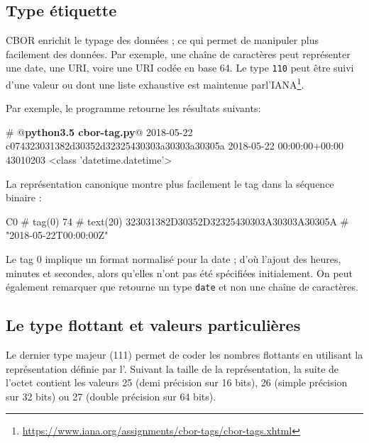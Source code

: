 \subsection{Type étiquette}

CBOR enrichit le typage des données ; ce qui permet de manipuler plus facilement des données. Par exemple, une chaîne de caractères peut représenter une date, une URI, voire une URI codée en base 64. Le type \texttt{110} peut être suivi d'une valeur ou  dont une liste exhaustive est maintenue parl'IANA\footnote{\url{https://www.iana.org/assignments/cbor-tags/cbor-tags.xhtml}}.


Par exemple, le programme  retourne les résultats suivants:

\begin{termc}[backgroundcolor=\color{palerod}, language=json, basicstyle=\ttfamily\small, escapechar=@]
# @\textbf{python3.5 cbor-tag.py}@
2018-05-22
c074323031382d30352d32325430303a30303a30305a
2018-05-22 00:00:00+00:00
43010203
<class 'datetime.datetime'>
\end{termc}


La représentation canonique montre plus facilement le tag dans la séquence binaire :
\begin{termc}[backgroundcolor=\color{palerod}, language=json, basicstyle=\ttfamily\small, escapechar=@]
C0                                      # tag(0)
   74                                   # text(20)
      323031382D30352D32325430303A30303A30305A # "2018-05-22T00:00:00Z"
\end{termc}

Le tag 0 implique un format normalisé pour la date ; d'où l'ajout des heures, minutes et secondes, alors qu'elles n'ont pas été spécifiées initialement. On peut également remarquer que  retourne un type \texttt{date} et non une chaîne de caractères.

\subsection{Le type flottant et valeurs particulières}
Le dernier type majeur (111) permet de coder les nombres flottants en utilisant la représentation définie par l'. Suivant la taille de la représentation, la suite de l'octet contient les valeurs 25 (demi précision sur 16 bits), 26 (simple précision sur 32 bits) ou 27 (double précision sur 64 bits).


